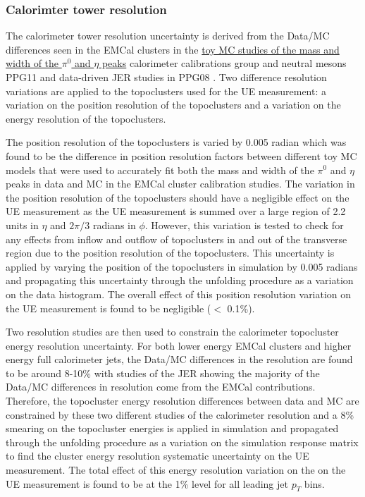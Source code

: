 \subsubsection{Calorimter tower resolution}
The calorimeter tower resolution uncertainty is derived from the Data/MC differences seen in the EMCal clusters in the \href{https://indico.bnl.gov/login/?next=/event/31859/contributions/120756/attachments/68548/117758/EMCal_toyMC_calib_20260302.pdf}{toy MC studies of the mass and width of the $\pi^{0}$ and $\eta$ peaks} calorimeter calibrations group and neutral mesons PPG11 and data-driven JER studies in PPG08 \cite{ppg08AN}.
Two difference resolution variations are applied to the topoclusters used for the UE measurement: a variation on the position resolution of the topoclusters and a variation on the energy resolution of the topoclusters.

The position resolution of the topoclusters is varied by 0.005 radian which was found to be the difference in position resolution factors between different toy MC models that were used to accurately fit both the mass and width of the $\pi^{0}$ and $\eta$ peaks in data and MC in the EMCal cluster calibration studies.
The variation in the position resolution of the topoclusters should have a negligible effect on the UE measurement as the UE measurement is summed over a large region of 2.2 units in $\eta$ and $2 \pi/ 3$ radians in $\phi$.
However, this variation is tested to check for any effects from inflow and outflow of topoclusters in and out of the transverse region due to the position resolution of the topoclusters.
This uncertainty is applied by varying the position of the topoclusters in simulation by 0.005 radians and propagating this uncertainty through the unfolding procedure as a variation on the data histogram.
The overall effect of this position resolution variation on the UE measurement is found to be negligible ($<$ 0.1\%).

Two resolution studies are then used to constrain the calorimeter topocluster energy resolution uncertainty.
For both lower energy EMCal clusters and higher energy full calorimeter jets, the Data/MC differences in the resolution are found to be around 8-10\% with studies of the JER showing the majority of the Data/MC differences in resolution come from the EMCal contributions.
Therefore, the topocluster energy resolution differences between data and MC are constrained by these two different studies of the calorimeter resolution and a 8\% smearing on the topocluster energies is applied in simulation and propagated through the unfolding procedure as a variation on the simulation response matrix to find the cluster energy resolution systematic uncertainty on the UE measurement.
The total effect of this energy resolution variation on the on the UE measurement is found to be at the 1\% level for all leading jet $p_T$ bins.

